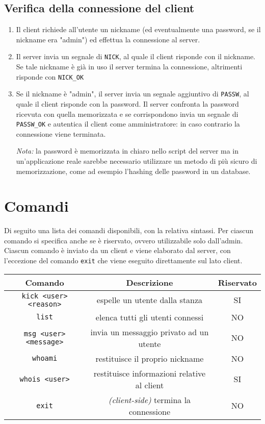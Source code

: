 \documentclass[a4paper,12pt]{report}
\begin{document}
\subsection{Verifica della connessione del client}

\begin{enumerate}
    \item Il client richiede all'utente un nickname (ed eventualmente una password, se il nickname era "admin") ed effettua la connessione al server.
    \item Il server invia un segnale di \verb|NICK|, al quale il client risponde con il nickname. Se tale nickname è già in uso il server termina la connessione, altrimenti risponde con \verb|NICK_OK|
    \item Se il nickname è "admin", il server invia un segnale aggiuntivo di \verb|PASSW|, al quale il client risponde con la password. Il server confronta la password ricevuta con quella memorizzata e se corrispondono invia un segnale di \verb|PASSW_OK| e autentica il client come amministratore: in caso contrario la connessione viene terminata. \par
    \textit{Nota:} la password è memorizzata in chiaro nello script del server ma in un'applicazione reale sarebbe necessario utilizzare un metodo di più sicuro di memorizzazione, come ad esempio l'hashing delle password in un database.
\end{enumerate}

\section{Comandi}

Di seguito una lista dei comandi disponibili, con la relativa sintassi. Per ciascun comando si specifica anche se è riservato, ovvero utilizzabile solo dall'admin. Ciascun comando è inviato da un client e viene elaborato dal server, con l'eccezione del comando \verb|exit| che viene eseguito direttamente sul lato client.

\begin{table}[htbp]
    \begin{tabular}{ccc}
        \rowcolor{lime!50} 
        \textbf{Comando}& \textbf{Descrizione}& \textbf{Riservato} \\ \hline
        \verb |kick <user> <reason>| & espelle un utente dalla stanza & SI \\ \hline
        \verb |list| & elenca tutti gli utenti connessi & NO \\ \hline
        \verb |msg <user> <message>| & invia un messaggio privato ad un utente & NO \\ \hline
        \verb |whoami| & restituisce il proprio nickname & NO \\ \hline
        \verb |whois <user>| & restituisce informazioni relative al client & SI \\ \hline
        \verb |exit| & \textit{(client-side)} termina la connessione & NO \\ \hline
    \end{tabular}
\end{table}
\end{document}
